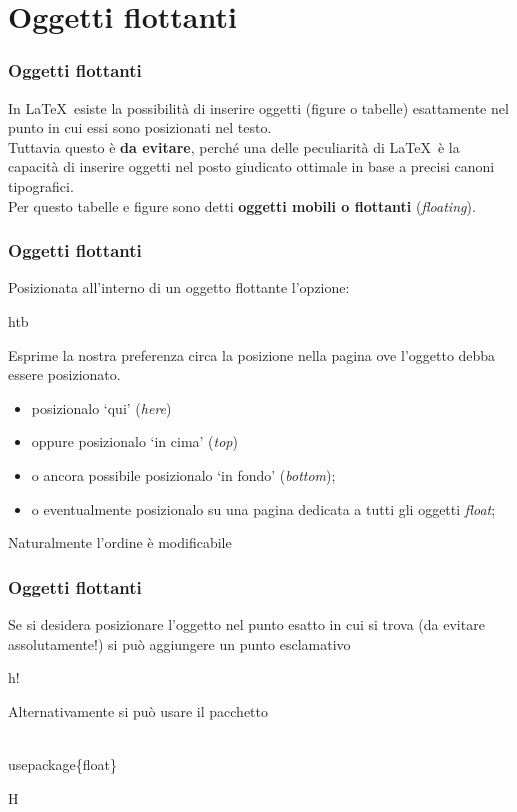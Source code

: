\section{Oggetti flottanti}
\begin{frame}
  \frametitle{Oggetti flottanti}
	In \LaTeX\ esiste la possibilit\`a di inserire oggetti (figure o tabelle) esattamente nel punto in cui essi sono posizionati nel testo.\\
  \smallskip
	Tuttavia questo \`e \textbf{da evitare}, perch\'e una delle peculiarit\`a di \LaTeX\ \`e la capacit\`a di inserire oggetti nel posto giudicato ottimale in base a precisi canoni tipografici.\\
  \bigskip
	Per questo tabelle e figure sono detti \textbf{oggetti mobili o flottanti} (\emph{floating}).
\end{frame}
\begin{frame}
  \frametitle{Oggetti flottanti}
	Posizionata all'interno di un oggetto flottante l'opzione:
	\begin{LaTeXcode}
		\tls htb\trs 
	\end{LaTeXcode}	
	Esprime la nostra preferenza circa la posizione nella pagina ove l'oggetto debba essere posizionato. 
  \medskip
	\begin{itemize}
		\item {} posizionalo `qui' (\emph{here})
		\item {} oppure posizionalo `in cima' (\emph{top})
		\item {} o ancora possibile posizionalo `in fondo' (\emph{bottom}); 
		\item {} o eventualmente posizionalo su una pagina dedicata a tutti gli oggetti \textit{float}; 
	\end{itemize}
	Naturalmente l'ordine \`e modificabile
\end{frame}
\begin{frame}
  \frametitle{Oggetti flottanti}
	Se si desidera posizionare l'oggetto nel punto esatto in cui si trova (da evitare assolutamente!) si pu\`o aggiungere un punto esclamativo
	\begin{LaTeXcode}
		\tls h!\trs 
	\end{LaTeXcode}	
  \medskip
	Alternativamente si pu\`o usare il pacchetto \LCmd[]{float}
	\begin{LaTeXcode}
		\\usepackage\{\alert{float}\}
	\end{LaTeXcode}	
	\begin{LaTeXcode}
		\tls H\trs
	\end{LaTeXcode}	
\end{frame}
